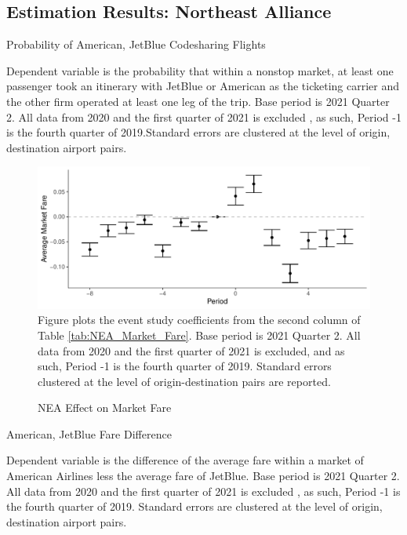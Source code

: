 \documentclass{article}
\begin{document}
\begin{appendices}
	
	\FloatBarrier
	
	\subsection{Estimation Results: Northeast Alliance}

	\begin{table}
	\caption{Probability of American, JetBlue Codesharing Flights}
	\label{tab:NEA_Switch_Prob}
	
	\footnotesize{Dependent variable is the probability that within a nonstop market, at least one passenger took an itinerary with JetBlue or American as the ticketing carrier and the other firm operated at least one leg of the trip. Base period is 2021 Quarter 2. All data from 2020 and the first quarter of 2021 is excluded , as such,  Period -1 is the fourth quarter of 2019.Standard errors are clustered at the level of origin, destination airport pairs.}
\end{table}

        \begin{figure}
		\caption{NEA Effect on Market Fare}
		\label{fig:NEA_Market_Fare}
		\includegraphics[width = \linewidth]{NEA_Market_Fare_Graph.pdf}
		\footnotesize{Figure plots the event study coefficients from the second column of Table \ref{tab:NEA_Market_Fare}. Base period is 2021 Quarter 2. All data from 2020 and the first quarter of 2021 is excluded, and as such, Period -1 is the fourth quarter of 2019. Standard errors clustered at the level of origin-destination pairs are reported.}
	\end{figure}

	
	\begin{table}
		\caption{American, JetBlue Fare Difference}
		\label{tab:NEA_Fare_Neutral}
		
		\footnotesize{Dependent variable is the difference of the average fare within a market of American Airlines less the average fare of JetBlue. Base period is 2021 Quarter 2. All data from 2020 and the first quarter of 2021 is excluded , as such,  Period -1 is the fourth quarter of 2019. Standard errors are clustered at the level of origin, destination airport pairs.}
	\end{table}
	

\end{appendices}
\end{document}
